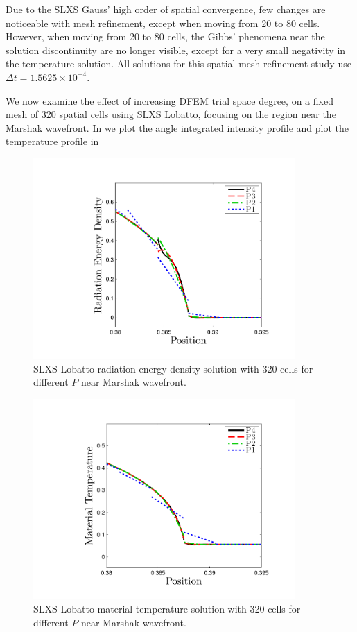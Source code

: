 Due to the SLXS Gauss' high order of spatial convergence, few changes are noticeable with mesh refinement, except when moving from 20 to 80 cells.
However, when moving from 20 to 80 cells, the Gibbs' phenomena near the solution discontinuity are no longer visible, except for a very small negativity in the temperature solution.
All solutions for this spatial mesh refinement study use $\Delta t = 1.5625 \times 10^{-4}$.

We now examine the effect of increasing DFEM trial space degree, on a fixed mesh of 320 spatial cells using SLXS Lobatto, focusing on the region near the Marshak wavefront.
In  we plot the angle integrated intensity profile and plot the temperature profile in 
\begin{figure}[!htp]
\centering
\includegraphics[width=10cm,trim=1.0in  0.2in 0.5in 0.5in,clip=true]{chapter6_grey_radtran/Dissertation_Data/Pointless_Marshak_Zoom_Radiation_Lobatto_P_Refinement.pdf}
\caption{SLXS Lobatto radiation energy density solution with 320 cells for different $P$ near Marshak wavefront.}
\label{fig:p_convergence_rad}
\end{figure}
%
\begin{figure}[!hbp]
\centering
\includegraphics[width=10cm,trim=1.0in  0.2in 0.5in 0.5in,clip=true]{chapter6_grey_radtran/Dissertation_Data/Pointless_Marshak_Zoom_Temperature_Lobatto_P_Refinement.pdf}
\caption{SLXS Lobatto material temperature solution with 320 cells for different $P$ near Marshak wavefront.}
\label{fig:p_convergence_temp}
\end{figure}
